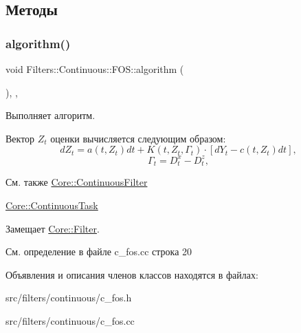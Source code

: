 \subsection{Методы}
\hypertarget{class_filters_1_1_continuous_1_1_f_o_s_a6db8005b66c345d94cdd4498edad9022}{}\label{class_filters_1_1_continuous_1_1_f_o_s_a6db8005b66c345d94cdd4498edad9022} 
\subsubsection{\texorpdfstring{algorithm()}{algorithm()}}
{\footnotesize\ttfamily void Filters\+::\+Continuous\+::\+F\+O\+S\+::algorithm (\begin{DoxyParamCaption}{ }\end{DoxyParamCaption})\hspace{0.3cm}{\ttfamily [override]}, {\ttfamily [protected]}, {\ttfamily [virtual]}}



Выполняет алгоритм. 

Вектор $Z_t$ оценки вычисляется следующим образом\+: \[dZ_t = a(t,Z_t)dt + K(t,Z_t, \Gamma_t)\cdot [ dY_t - c(t,Z_t)dt],\] \[\Gamma_t = D_t^x - D_t^z,\]

\begin{DoxySeeAlso}{См. также}
\hyperlink{class_core_1_1_continuous_filter}{Core\+::\+Continuous\+Filter} 

\hyperlink{class_core_1_1_continuous_task}{Core\+::\+Continuous\+Task} 
\end{DoxySeeAlso}


Замещает \hyperlink{class_core_1_1_filter_a438681ee3e54aba2148042d9f8011ab8}{Core\+::\+Filter}.



См. определение в файле c\+\_\+fos.\+cc строка 20



Объявления и описания членов классов находятся в файлах\+:\begin{DoxyCompactItemize}
\item 
src/filters/continuous/c\+\_\+fos.\+h\item 
src/filters/continuous/c\+\_\+fos.\+cc\end{DoxyCompactItemize}
